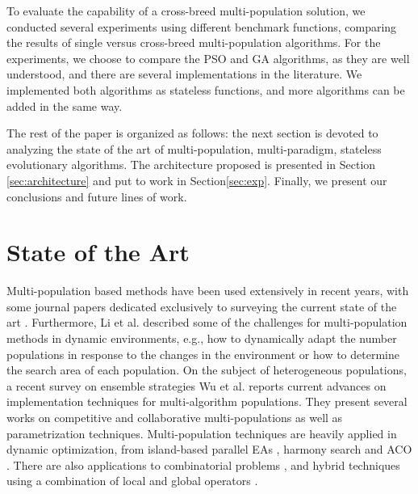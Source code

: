 \documentclass[runningheads]{llncs}
\begin{document}

To evaluate the capability of a cross-breed multi-population solution,
we conducted several experiments using different benchmark functions, comparing the
results of single versus cross-breed multi-population algorithms. For the experiments, we choose to
compare the PSO and GA algorithms, as they are well understood, and there are
several implementations in the literature. We implemented both algorithms as
stateless functions, and more algorithms can be added in the same way.



The rest of the paper is organized as follows: the next section is devoted
to analyzing the state of the art of multi-population, multi-paradigm,
stateless evolutionary algorithms. The architecture proposed is
presented in Section \ref{sec:architecture} and put to work in Section\ref{sec:exp}.
Finally, we present our conclusions and future lines of work.

\section{State of the Art}

 
Multi-population based methods have been used extensively in recent years, with
some journal papers dedicated exclusively to surveying the current state of the
art \cite{ma2019multi}. Furthermore,  Li et al. \cite{li2015multi} described
some of the challenges for multi-population methods in dynamic environments,
e.g., how to dynamically adapt the number populations in response to the changes
in the environment or how to determine the search area of each population. On
the subject of heterogeneous populations, a recent survey on ensemble strategies
Wu et al. \cite{wu2019ensemble} reports current advances on implementation
techniques for multi-algorithm populations. They present several works on
competitive and collaborative multi-populations as well as parametrization
techniques. Multi-population techniques are heavily applied in dynamic optimization, from
island-based parallel EAs \cite{lissovoi2017runtime}, harmony search
\cite{turky2014multi} and ACO \cite{nseef2016adaptive}. There are also 
applications to combinatorial problems \cite{pourvaziri2014hybrid}, 
and hybrid techniques using a combination of local and global operators
\cite{bai2018integrated}.
\end{document}
